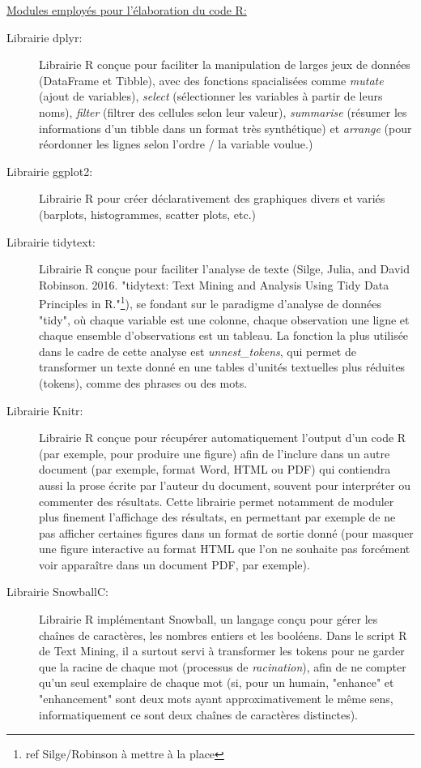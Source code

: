 \documentclass{book}
\begin{document}
        \vspace{\baselineskip}
        \noindent
        \underline{Modules employés pour l'élaboration du code R:}
\begin{description}
    \item[Librairie dplyr:] Librairie R conçue pour faciliter la manipulation de larges jeux de données (DataFrame et Tibble), avec des fonctions spacialisées comme \textit{mutate} (ajout de variables), \textit{select} (sélectionner les variables à partir de leurs noms), \textit{filter} (filtrer des cellules selon leur valeur), \textit{summarise} (résumer les informations d'un tibble dans un format très synthétique) et \textit{arrange} (pour réordonner les lignes selon l'ordre / la variable voulue.)
    \item[Librairie ggplot2:] Librairie R pour créer déclarativement des graphiques divers et variés (barplots, histogrammes, scatter plots, etc.)
    \item[Librairie tidytext:] Librairie R conçue pour faciliter l'analyse de texte (Silge, Julia, and David Robinson. 2016. "tidytext: Text Mining and Analysis Using Tidy Data Principles in R."\footnote{ref Silge/Robinson à mettre à la place}), se fondant sur le paradigme d'analyse de données "tidy", où chaque variable est une colonne, chaque observation une ligne et chaque ensemble d'observations est un tableau. La fonction la plus utilisée dans le cadre de cette analyse est \textit{unnest\_tokens}, qui permet de transformer un texte donné en une tables d'unités textuelles plus réduites (tokens), comme des phrases ou des mots.
    \item[Librairie Knitr:] Librairie R conçue pour récupérer automatiquement l'output d'un code R (par exemple, pour produire une figure) afin de l'inclure dans un autre document (par exemple, format Word, HTML ou PDF) qui contiendra aussi la prose écrite par l'auteur du document, souvent pour interpréter ou commenter des résultats. Cette librairie permet notamment de moduler plus finement l'affichage des résultats, en permettant par exemple de ne pas afficher certaines figures dans un format de sortie donné (pour masquer une figure interactive au format HTML que l'on ne souhaite pas forcément voir apparaître dans un document PDF, par exemple).
    \item[Librairie SnowballC:] Librairie R implémentant Snowball, un langage conçu pour gérer les chaînes de caractères, les nombres entiers et les booléens. Dans le script R de Text Mining, il a surtout servi à transformer les tokens pour ne garder que la racine de chaque mot (processus de \textit{racination}), afin de ne compter qu'un seul exemplaire de chaque mot (si, pour un humain, "enhance" et "enhancement" sont deux mots ayant approximativement le même sens, informatiquement ce sont deux chaînes de caractères distinctes).

\end{description}
\end{document}
